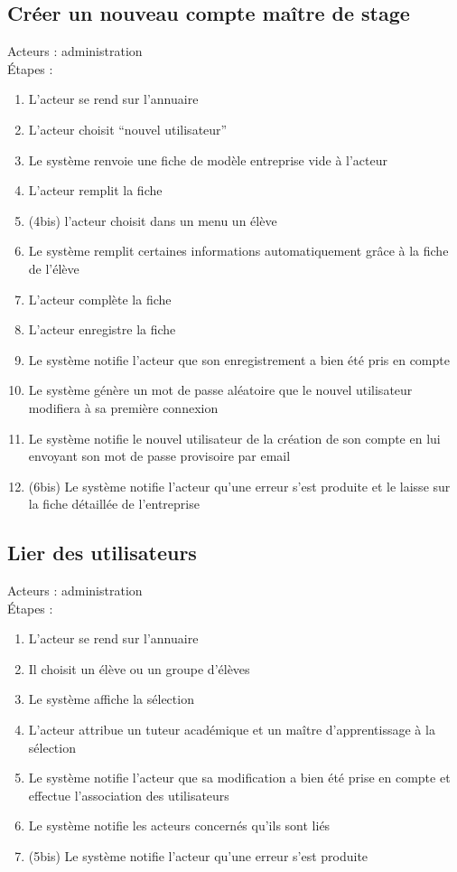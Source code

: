 \documentclass{scrreprt}
\begin{document}
\subsection{Créer un nouveau compte maître de stage}
Acteurs : administration
\\
\'Etapes :
\begin{enumerate}
\item L’acteur se rend sur l’annuaire
\item L’acteur choisit “nouvel utilisateur”
\item Le système renvoie une fiche de modèle entreprise vide à l’acteur 
\item L’acteur remplit la fiche
\item (4bis) l’acteur choisit dans un menu un élève 
\item Le système remplit certaines informations automatiquement grâce à la fiche de l’élève
\item L’acteur complète la fiche
\item L’acteur enregistre la fiche
\item Le système notifie l’acteur que son enregistrement a bien été pris en compte
\item Le système génère un mot de passe aléatoire que le nouvel utilisateur modifiera à sa première connexion
\item Le système notifie le nouvel utilisateur de la création de son compte en lui envoyant son mot de passe provisoire par email
\item (6bis) Le système notifie l’acteur qu’une erreur s’est produite et le laisse sur la fiche détaillée de l’entreprise
\end{enumerate}
\subsection{ Lier des utilisateurs}
Acteurs : administration
\\
\'Etapes :
\begin{enumerate}
\item L’acteur se rend sur l’annuaire
\item Il choisit un élève ou un groupe d’élèves 
\item Le système affiche la sélection
\item L’acteur attribue un tuteur académique et un maître d’apprentissage à la sélection
\item Le système notifie l’acteur que sa modification a bien été prise en compte et effectue l’association des utilisateurs
\item Le système notifie les acteurs concernés qu’ils sont liés
\item (5bis) Le système notifie l’acteur qu’une erreur s’est produite 
\end{enumerate}
\end{document}
